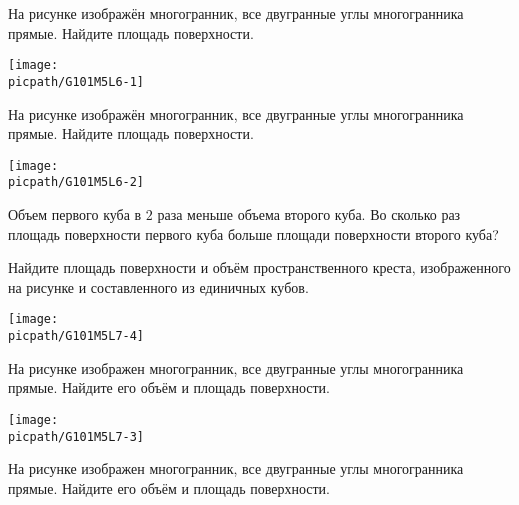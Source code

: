 \begin{consultation}
\begin{listofex}
		\item 
		\begin{minipage}[t]{\bodywidth}
			На рисунке изображён многогранник, все двугранные углы многогранника прямые. Найдите площадь поверхности.
		\end{minipage}
		\hspace{0.02\linewidth}
		\begin{minipage}[t]{\picwidth}
			\texttt{[image: \\picpath/G101M5L6-1]}
		\end{minipage}
		\item 
		\begin{minipage}[t]{\bodywidth}
			На рисунке изображён многогранник, все двугранные углы многогранника прямые. Найдите площадь поверхности.
		\end{minipage}
		\hspace{0.02\linewidth}
		\begin{minipage}[t]{\picwidth}
			\texttt{[image: \\picpath/G101M5L6-2]}
		\end{minipage}
		\item Объем первого куба в \( 2 \) раза меньше объема второго куба. Во сколько раз площадь поверхности первого куба больше площади поверхности второго куба?
		\item 
		\begin{minipage}[t]{\bodywidth}
			Найдите площадь поверхности и объём пространственного креста, изображенного на рисунке и составленного из единичных кубов.
		\end{minipage}
		\hspace{0.02\linewidth}
		\begin{minipage}[t]{\picwidth}
			\texttt{[image: \\picpath/G101M5L7-4]}
		\end{minipage}
		\item 
		\begin{minipage}[t]{\bodywidth}
			На рисунке изображен многогранник, все двугранные углы многогранника прямые. Найдите его объём и площадь поверхности.
		\end{minipage}
		\hspace{0.02\linewidth}
		\begin{minipage}[t]{\picwidth}
			\texttt{[image: \\picpath/G101M5L7-3]}
		\end{minipage}
		\item
		\begin{minipage}[t]{\bodywidth}
			На рисунке изображен многогранник, все двугранные углы многогранника прямые. Найдите его объём и площадь поверхности.

\end{minipage}
\end{listofex}
\end{consultation}
